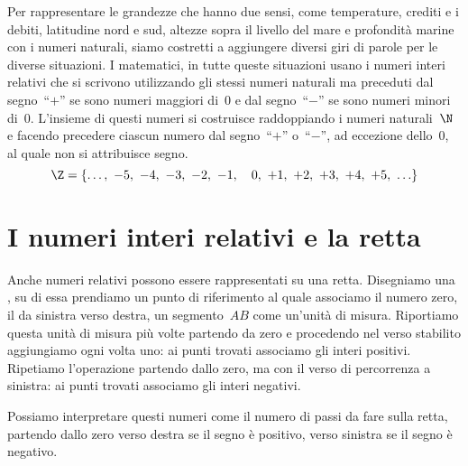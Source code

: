 Per rappresentare le grandezze che hanno due sensi, come temperature, 
crediti e i debiti, latitudine nord e sud, altezze sopra il livello del 
mare e profondità marine con i numeri naturali, siamo costretti a aggiungere 
diversi giri di parole per le diverse situazioni. 
I matematici, in tutte queste situazioni usano i numeri interi relativi che 
si scrivono utilizzando gli stessi numeri naturali ma preceduti dal 
segno~``\(+\)'' se sono numeri maggiori di~0 e dal segno~``\(-\)'' se sono 
numeri minori di~0. L'insieme di questi numeri si costruisce raddoppiando 
i numeri naturali~\(\N\) e facendo precedere ciascun numero dal 
segno~``\(+\)'' o~``\(-\)'',
ad eccezione dello~0, al quale non si attribuisce segno.
\[\Z=\lbrace\ldots,~ -5,~ -4,~ -3,~ -2,~ -1,~~~0,~ +1,~ +2,~ +3,~ +4,~ +5,~ 
\ldots \rbrace\]

\section{I numeri interi relativi e la retta}
\label{sec:int_retta}

Anche numeri relativi possono essere rappresentati su una retta. 
Disegniamo una , su di essa prendiamo 
un punto di riferimento al quale 
associamo il numero zero, il  da sinistra verso 
destra, un segmento~\(AB\) come un'unità di misura. 
Riportiamo questa unità di misura più volte partendo da zero e procedendo nel 
verso stabilito aggiungiamo ogni volta uno: ai punti trovati associamo gli 
interi positivi.
Ripetiamo l'operazione partendo dallo zero, ma con il verso di percorrenza 
a sinistra: ai punti trovati associamo gli interi negativi.

{\intrappgeo}

Possiamo interpretare questi numeri come il numero di passi da fare sulla 
retta, partendo dallo zero verso destra se il segno è positivo, verso 
sinistra se il segno è negativo.


